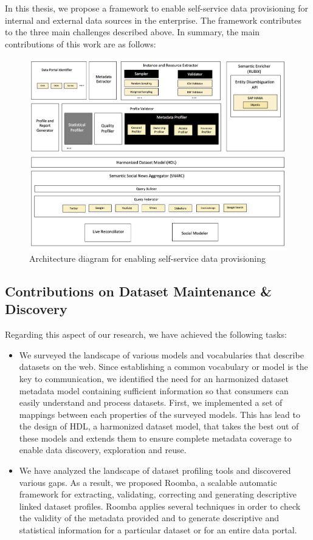 \documentclass[a4paper,11pt,twoside]{ThesisStyle}
\begin{document}
In this thesis, we propose a framework to enable self-service data provisioning for internal and external data sources in the enterprise. The framework contributes to the three main challenges described above. In summary, the main contributions of this work are as follows:

\begin{adjustwidth}{-.4in}{-.4in}
	\begin{figure}[!ht]
	  \centering
	  \includegraphics[scale=0.4]{figures/architecutre_diagram.png}
	  \caption{Architecture diagram for enabling self-service data provisioning}
	  \label{fig:architecutre_diagram}
	\end{figure}
\end{adjustwidth}

\subsection{Contributions on Dataset Maintenance \& Discovery}

Regarding this aspect of our research, we have achieved the following tasks:
\begin{itemize}
	\item We surveyed the landscape of various models and vocabularies that describe datasets on the web. Since establishing a common vocabulary or model is the key to communication, we identified the need for an harmonized dataset metadata model containing sufficient information so that consumers can easily understand and process datasets. First, we implemented a set of mappings between each properties of the surveyed models. This has lead to the design of HDL, a harmonized dataset model, that takes the best out of these models and extends them to ensure complete metadata coverage to enable data discovery, exploration and reuse.
	\item We have analyzed the landscape of dataset profiling tools and discovered various gaps. As a result, we proposed Roomba, a scalable automatic framework for extracting, validating, correcting and generating descriptive linked dataset profiles. Roomba applies several techniques in order to check the validity of the metadata provided and to generate descriptive and statistical information for a particular dataset or for an entire data portal.
\end{itemize}
\end{document}
